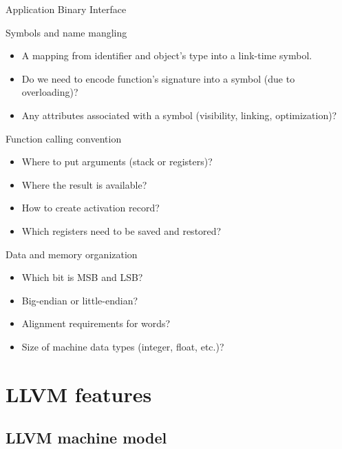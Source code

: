 \documentclass[8pt]{beamer}
\begin{document}
\begin{frame}{Application Binary Interface}
  \begin{block}{Symbols and name mangling}
    \begin{itemize}
      \item A mapping from identifier and object's type into a link-time symbol.
      \item Do we need to encode function's signature into a symbol (due to overloading)?
      \item Any attributes associated with a symbol (visibility, linking, optimization)?
    \end{itemize}
  \end{block}
    
  \begin{block}{Function calling convention}
    \begin{itemize}
      \item Where to put arguments (stack or registers)?
      \item Where the result is available?
      \item How to create activation record?
      \item Which registers need to be saved and restored?
    \end{itemize}
  \end{block}

  \begin{block}{Data and memory organization}
    \begin{itemize}
      \item Which bit is MSB and LSB?
      \item Big-endian or little-endian?
      \item Alignment requirements for words?
      \item Size of machine data types (integer, float, etc.)?
    \end{itemize}
  \end{block}
\end{frame}

\section[Features]{LLVM features}
\subsection*{LLVM machine model}
\end{document}
